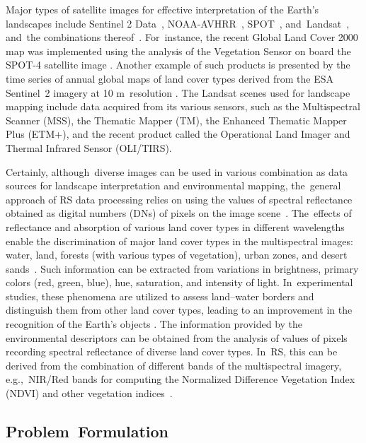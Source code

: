 \documentclass[earth,article,accept,pdftex,moreauthors]{Definitions/mdpi}
\begin{document}
Major types of satellite images for effective interpretation of the Earth's landscapes include Sentinel 2 Data~\cite{Ngom,TONG2020111598}, NOAA-AVHRR~\cite{KONARSKA2002491,ANYAMBA2005596,Frederiksen}, SPOT~\cite{SILVA2005188,MARTINEZ2011152}, and~Landsat~\cite{PIMPLE2020118007,Lemenkova202315}, and~the combinations thereof~\cite{rs12193157}. For~instance, the recent Global Land Cover 2000 map was {implemented using }the analysis of the Vegetation Sensor on board the SPOT-4 satellite {image }\cite{Mayaux}. {Another example of such products is presented by the time series of annual global maps of land cover types derived from {the }ESA Sentinel~2 imagery at 10 m~resolution }\cite{Karraetal}. {The }Landsat scenes used for landscape mapping include{ }data acquired from {its }various{ }sensors, such as the Multispectral Scanner (MSS), the Thematic Mapper (TM), the Enhanced Thematic Mapper Plus (ETM+), and the recent product called the Operational Land Imager and Thermal Infrared Sensor (OLI/TIRS).

Certainly, although~diverse images can be used in various combination as data sources for landscape interpretation and environmental mapping, the~general approach of {RS} data processing relies on using {the values of} spectral reflectance obtained as {digital numbers (DNs)} of pixels on the image scene~\cite{ACKER2014}. The~effects of reflectance and absorption of various land cover types in different wavelengths{ }{enable} the discrimination of major land cover types in the multispectral images: water, land, forests (with various types of vegetation), urban zones, {and} desert sands~\cite{rs12101634}. {Such information can be extracted from} variations in brightness, primary colors  (red, green, blue), hue, saturation, and intensity of light{. In~experimental studies, these phenomena {are} utilized to assess land--water borders and distinguish them from other land cover types, leading to an improvement in the recognition of the Earth's objects} \cite{rs13132454}. {The} information{ }provided by the environmental descriptors{ }can be obtained from the analysis of values of pixels recording spectral reflectance of diverse land cover types{. In~{RS}, this can be} derived from the combination of different bands {of the} multispectral imagery, e.g.,~NIR/Red bands for computing the Normalized Difference Vegetation Index (NDVI) and other vegetation indices~\cite{CRIPPEN199071,LI2004463,jmse11040871,RUAN2022157075}.

\subsection{Problem~Formulation}
\end{document}
